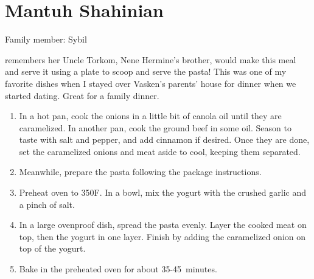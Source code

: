 \chapter{Mantuh Shahinian}
\label{ch:mantuhshahinian}


Family member: Sybil

 remembers her Uncle Torkom, Nene Hermine's brother, would make this meal and serve it using a plate to scoop and serve the pasta! This was one of my favorite dishes when I stayed over Vasken's parents' house for dinner when we started dating. Great for a family dinner.

\begin{enumerate}
    \item In a hot pan, cook the onions in a little bit of canola oil until they are caramelized. In another pan, cook the ground beef in some oil. Season to taste with salt and pepper, and add cinnamon if desired. Once they are done, set the caramelized onions and meat aside to cool, keeping them separated.
    \item Meanwhile, prepare the pasta following the package instructions.
    \item Preheat oven to 350\degree F. In a bowl, mix the yogurt with the crushed garlic and a pinch of salt.
    \item In a large ovenproof dish, spread the pasta evenly. Layer the cooked meat on top, then the yogurt in one layer. Finish by adding the caramelized onion on top of the yogurt.
    \item Bake in the preheated oven for about 35-45~minutes.
\end{enumerate}
